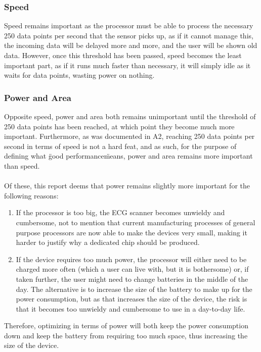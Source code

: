 \documentclass[12pt,a4paper]{article}
\begin{document}
	\subsubsection{Speed}
	Speed remains important as the processor must be able to process the necessary 250 data points per second that the sensor picks up, as if it cannot manage this, the incoming data will be delayed more and more, and the user will be shown old data. However, once this threshold has been passed, speed becomes the least important part, as if it runs much faster than necessary, it will simply idle as it waits for data points, wasting power on nothing.\\
	
	\subsubsection{Power and Area}
	Opposite speed, power and area both remains unimportant until the threshold of 250 data points has been reached, at which point they become much more important. Furthermore, as was documented in A2, reaching 250 data points per second in terms of speed is not a hard feat, and as such, for the purpose of defining what \"good performance\" means, power and area remains more important than speed.\\
	\\
	Of these, this report deems that power remains slightly more important for the following reasons:\\
	\begin{enumerate}
	\item If the processor is too big, the ECG scanner becomes unwieldy and cumbersome, not to mention that current manufacturing processes of general purpose processors are now able to make the devices very small, making it harder to justify why a dedicated chip should be produced.
	\item If the device requires too much power, the processor will either need to be charged more often (which a user can live with, but it is bothersome) or, if taken further, the user might need to change batteries in the middle of the day. The alternative is to increase the size of the battery to make up for the power consumption, but as that increases the size of the device, the risk is that it becomes too unwieldy and cumbersome to use in a day-to-day life.
	\end{enumerate}
	Therefore, optimizing in terms of power will both keep the power consumption down and keep the battery from requiring too much space, thus increasing the size of the device.\\
	
\end{document}

